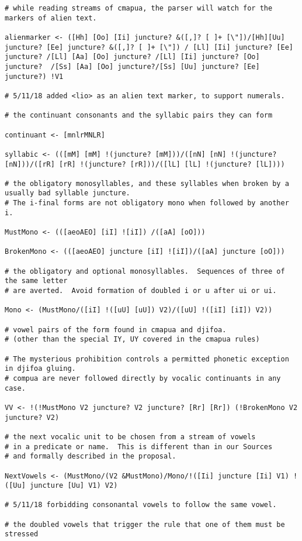 \documentclass[12pt]{book}
\begin{document}
{\begin{verbatim}
# while reading streams of cmapua, the parser will watch for the markers of alien text.

alienmarker <- ([Hh] [Oo] [Ii] juncture? &([,]? [ ]+ [\"])/[Hh][Uu] juncture? [Ee] juncture? &([,]? [ ]+ [\"]) / [Ll] [Ii] juncture? [Ee] juncture? /[Ll] [Aa] [Oo] juncture? /[Ll] [Ii] juncture? [Oo] juncture?  /[Ss] [Aa] [Oo] juncture?/[Ss] [Uu] juncture? [Ee] juncture?) !V1

# 5/11/18 added <lio> as an alien text marker, to support numerals.

# the continuant consonants and the syllabic pairs they can form

continuant <- [mnlrMNLR]

syllabic <- (([mM] [mM] !(juncture? [mM]))/([nN] [nN] !(juncture? [nN]))/([rR] [rR] !(juncture? [rR]))/([lL] [lL] !(juncture? [lL])))

# the obligatory monosyllables, and these syllables when broken by a usually bad syllable juncture.
# The i-final forms are not obligatory mono when followed by another i.

MustMono <- (([aeoAEO] [iI] ![iI]) /([aA] [oO]))

BrokenMono <- (([aeoAEO] juncture [iI] ![iI])/([aA] juncture [oO]))

# the obligatory and optional monosyllables.  Sequences of three of the same letter
# are averted.  Avoid formation of doubled i or u after ui or ui.

Mono <- (MustMono/([iI] !([uU] [uU]) V2)/([uU] !([iI] [iI]) V2))

# vowel pairs of the form found in cmapua and djifoa.
# (other than the special IY, UY covered in the cmapua rules)

# The mysterious prohibition controls a permitted phonetic exception in djifoa gluing.
# compua are never followed directly by vocalic continuants in any case.

VV <- !(!MustMono V2 juncture? V2 juncture? [Rr] [Rr]) (!BrokenMono V2 juncture? V2)

# the next vocalic unit to be chosen from a stream of vowels
# in a predicate or name.  This is different than in our Sources
# and formally described in the proposal.

NextVowels <- (MustMono/(V2 &MustMono)/Mono/!([Ii] juncture [Ii] V1) !([Uu] juncture [Uu] V1) V2)

# 5/11/18 forbidding consonantal vowels to follow the same vowel.

# the doubled vowels that trigger the rule that one of them must be stressed


\end{verbatim}}
\end{document}
